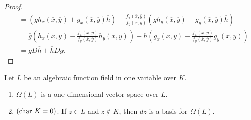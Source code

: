 \begin{proof}
\begin{align*}
            &= (\overline{g}h_x(\overline{x},\overline{y})+g_x(\overline{x},\overline{y})\overline{h})-\frac{f_x(\overline{x},\overline{y})}{f_y(\overline{x},\overline{y})}(\overline{g}h_y(\overline{x},\overline{y})+g_y(\overline{x},\overline{y})\overline{h})\\
            &= \overline{g}\left(h_x(\overline{x},\overline{y})-\frac{f_x(\overline{x},\overline{y})}{f_y(\overline{x},\overline{y})}h_y(\overline{x},\overline{y})\right) + \overline{h}\left(g_x(\overline{x},\overline{y})-\frac{f_x(\overline{x},\overline{y})}{f_y(\overline{x},\overline{y})}g_y(\overline{x},\overline{y})\right)\\
            &= \overline{g}D\overline{h}+\overline{h}D\overline{g}.
        \end{align*}
    \end{proof}
    \begin{proposition}
        Let $L$ be an algebraic function field in one variable over $K$. 
        \begin{enumerate}
            \item $\Omega(L)$ is a one dimensional vector space over $L$. 
            \item $(\mathrm{char} \ K = 0)$. If $z\in L$ and $z\notin K$, then $dz$ is a basis for $\Omega(L)$.
        \end{enumerate}
    \end{proposition}
